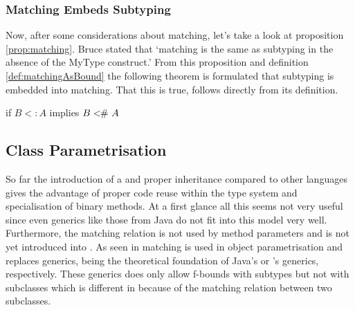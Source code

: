 \subsubsection{Matching Embeds Subtyping}
Now, after some considerations about matching, let's take a look at
proposition \ref{prop:matching}. Bruce stated that `matching is the
same as subtyping in the absence of the MyType construct.' From this
proposition and definition \ref{def:matchingAsBound} the following theorem
is formulated that subtyping is embedded into matching. That this is true,
follows directly from its definition.

\begin{prop}
	\label{prop:matchinIsSubtyping}
	if $B <: A$ implies $B <\!\!\#~ A$
\end{prop}
%
%

%


\subsection{Class Parametrisation}
So far the introduction of a \mytype and proper inheritance compared to
other languages gives the advantage of proper code reuse within the type
system and specialisation of binary methods. At a first glance all this
seems not very useful since even generics like those from Java do not fit
into this model very well. Furthermore, the matching relation is not used
by method parameters and is not yet introduced into \ooplss.  As seen
in  matching is used in object
parametrisation and replaces generics, being the theoretical foundation
of Java's or \cs's generics, respectively. These generics does only
allow f-bounds with subtypes but not with subclasses which is different
in \ooplss because of the matching relation between two subclasses.

